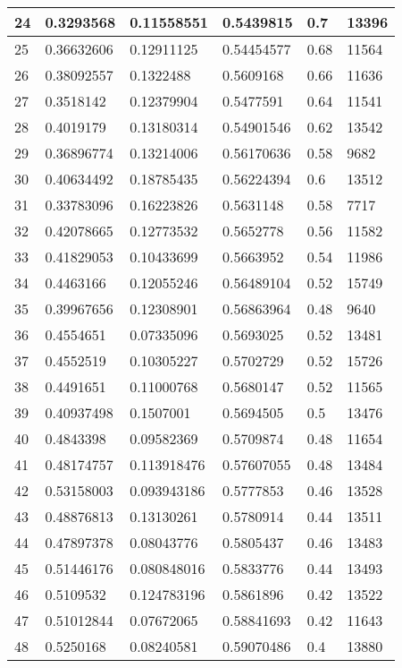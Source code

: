 \begin{longtable}{|l|l|l|l|l|l|}
24 & 0.3293568 & 0.11558551 & 0.5439815 & 0.7 & 13396 \\ \hline 
25 & 0.36632606 & 0.12911125 & 0.54454577 & 0.68 & 11564 \\ \hline 
26 & 0.38092557 & 0.1322488 & 0.5609168 & 0.66 & 11636 \\ \hline 
27 & 0.3518142 & 0.12379904 & 0.5477591 & 0.64 & 11541 \\ \hline 
28 & 0.4019179 & 0.13180314 & 0.54901546 & 0.62 & 13542 \\ \hline 
29 & 0.36896774 & 0.13214006 & 0.56170636 & 0.58 & 9682 \\ \hline 
30 & 0.40634492 & 0.18785435 & 0.56224394 & 0.6 & 13512 \\ \hline 
31 & 0.33783096 & 0.16223826 & 0.5631148 & 0.58 & 7717 \\ \hline 
32 & 0.42078665 & 0.12773532 & 0.5652778 & 0.56 & 11582 \\ \hline 
33 & 0.41829053 & 0.10433699 & 0.5663952 & 0.54 & 11986 \\ \hline 
34 & 0.4463166 & 0.12055246 & 0.56489104 & 0.52 & 15749 \\ \hline 
35 & 0.39967656 & 0.12308901 & 0.56863964 & 0.48 & 9640 \\ \hline 
36 & 0.4554651 & 0.07335096 & 0.5693025 & 0.52 & 13481 \\ \hline 
37 & 0.4552519 & 0.10305227 & 0.5702729 & 0.52 & 15726 \\ \hline 
38 & 0.4491651 & 0.11000768 & 0.5680147 & 0.52 & 11565 \\ \hline 
39 & 0.40937498 & 0.1507001 & 0.5694505 & 0.5 & 13476 \\ \hline 
40 & 0.4843398 & 0.09582369 & 0.5709874 & 0.48 & 11654 \\ \hline 
41 & 0.48174757 & 0.113918476 & 0.57607055 & 0.48 & 13484 \\ \hline 
42 & 0.53158003 & 0.093943186 & 0.5777853 & 0.46 & 13528 \\ \hline 
43 & 0.48876813 & 0.13130261 & 0.5780914 & 0.44 & 13511 \\ \hline 
44 & 0.47897378 & 0.08043776 & 0.5805437 & 0.46 & 13483 \\ \hline 
45 & 0.51446176 & 0.080848016 & 0.5833776 & 0.44 & 13493 \\ \hline 
46 & 0.5109532 & 0.124783196 & 0.5861896 & 0.42 & 13522 \\ \hline 
47 & 0.51012844 & 0.07672065 & 0.58841693 & 0.42 & 11643 \\ \hline 
48 & 0.5250168 & 0.08240581 & 0.59070486 & 0.4 & 13880 \\ \hline 

\end{longtable}
